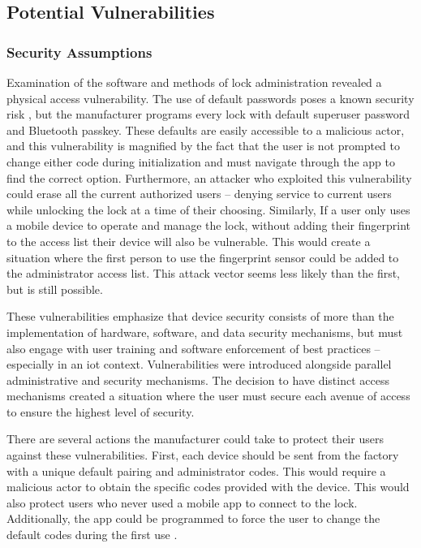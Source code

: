 \documentclass[conference]{IEEEtran}
\begin{document}
\subsection{Potential Vulnerabilities}
\subsubsection{Security Assumptions}

Examination of the software and methods of lock administration revealed a physical access vulnerability. The use of default passwords poses a known security risk \cite{Fraunholz2017}\cite{Niemietz2015}, but the manufacturer programs every lock with default superuser password and Bluetooth passkey.  These defaults are easily accessible to a malicious actor, and this vulnerability is magnified by the fact that the user is not prompted to change either code during initialization and must navigate through the app to find the correct option.  Furthermore, an attacker who exploited this vulnerability could erase all the current authorized users -- denying service to current users while unlocking the lock at a time of their choosing. Similarly, If a user only uses a mobile device to operate and manage the lock, without adding their fingerprint to the access list their device will also be vulnerable. This would create a situation where the first person to use the fingerprint sensor could be added to the administrator access list. This attack vector seems less likely than the first, but is still possible.

\bigskip

These vulnerabilities emphasize that device security consists of more than the implementation of hardware, software, and data security mechanisms, but must also engage with user training and software enforcement of best practices -- especially in an \gls{iot} context. Vulnerabilities were introduced alongside parallel administrative and security mechanisms. The decision to have distinct access mechanisms created a situation where the user must secure each avenue of access to ensure the highest level of security.

\bigskip

There are several actions the manufacturer could take to protect their users against these vulnerabilities. First, each device should be sent from the factory with a unique default pairing and administrator codes. This would require a malicious actor to obtain the specific codes provided with the device. This would also protect users who never used a mobile app to connect to the lock. Additionally, the app could be programmed to force the user to change the default codes during the first use  \cite{Fraunholz2017}\cite{Niemietz2015}.
\end{document}
